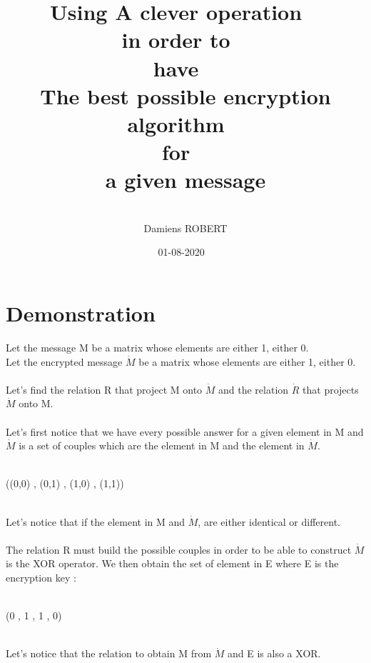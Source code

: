 \documentclass{article}
\title{Using A clever operation
~\\
in order to
~\\
have
~\\
The best possible encryption algorithm
~\\
for
~\\
a given message
}
\date{01-08-2020
~\\
}
\author{
~\\
Damiens ROBERT
}
\begin{document}
  \maketitle
  \section{Demonstration}
  Let the message M be a matrix whose elements are either 1, either 0.
  ~\\
  Let the encrypted message $\dot{M}$ be a matrix whose elements are either 1, either 0.
  ~\\
  ~\\
  Let's find the relation R that project M onto $\dot{M}$ and the relation $\dot{R}$ that projects $\dot{M}$ onto M.
  ~\\
  ~\\
  Let's first notice that we have every possible answer for a given element in M and $\dot{M}$ is a set of couples which are the element in M and the element in $\dot{M}$.
  ~\\
  ~\\
  \centerline{
  ((0,0) , (0,1) , (1,0) , (1,1))
  }
  ~\\
  Let's notice that if the element in M and $\dot{M}$, are either identical or different.
  ~\\
  ~\\
  The relation R must build the possible couples in order to be able to construct $\dot{M}$ is the XOR operator. We then obtain the set of element in E where E is the encryption key :
  ~\\
  ~\\
  \centerline{
  (0 , 1 , 1 , 0)
  }
  ~\\
  Let's notice that the relation to obtain M from $\dot{M}$ and E is also a XOR.
\end{document}
